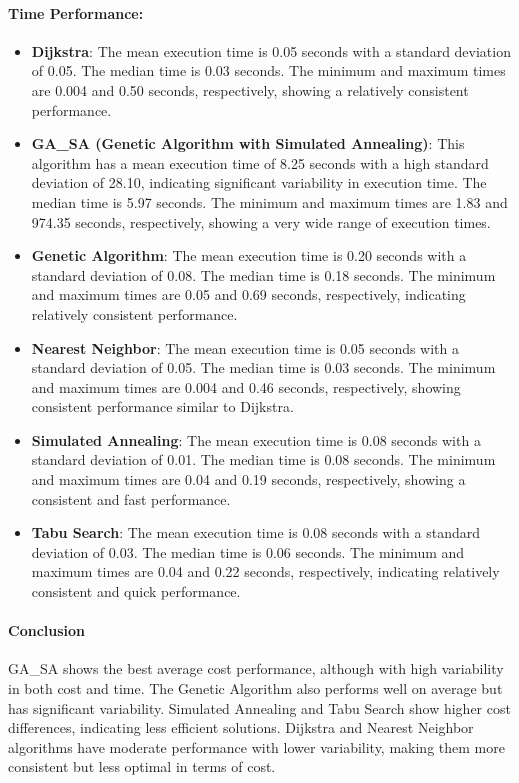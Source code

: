 \documentclass{article}
\begin{document}
    \paragraph{Time Performance:}
    \begin{itemize}
        \item \textbf{Dijkstra}: The mean execution time is 0.05 seconds with a standard deviation of 0.05. The median time is 0.03 seconds. The minimum and maximum times are 0.004 and 0.50 seconds, respectively, showing a relatively consistent performance.
        \item \textbf{GA\_SA (Genetic Algorithm with Simulated Annealing)}: This algorithm has a mean execution time of 8.25 seconds with a high standard deviation of 28.10, indicating significant variability in execution time. The median time is 5.97 seconds. The minimum and maximum times are 1.83 and 974.35 seconds, respectively, showing a very wide range of execution times.
        \item \textbf{Genetic Algorithm}: The mean execution time is 0.20 seconds with a standard deviation of 0.08. The median time is 0.18 seconds. The minimum and maximum times are 0.05 and 0.69 seconds, respectively, indicating relatively consistent performance.
        \item \textbf{Nearest Neighbor}: The mean execution time is 0.05 seconds with a standard deviation of 0.05. The median time is 0.03 seconds. The minimum and maximum times are 0.004 and 0.46 seconds, respectively, showing consistent performance similar to Dijkstra.
        \item \textbf{Simulated Annealing}: The mean execution time is 0.08 seconds with a standard deviation of 0.01. The median time is 0.08 seconds. The minimum and maximum times are 0.04 and 0.19 seconds, respectively, showing a consistent and fast performance.
        \item \textbf{Tabu Search}: The mean execution time is 0.08 seconds with a standard deviation of 0.03. The median time is 0.06 seconds. The minimum and maximum times are 0.04 and 0.22 seconds, respectively, indicating relatively consistent and quick performance.
    \end{itemize}

    \paragraph{Conclusion}

    GA\_SA shows the best average cost performance, although with high variability in both cost and time.
    The Genetic Algorithm also performs well on average but has significant variability.
    Simulated Annealing and Tabu Search show higher cost differences, indicating less efficient solutions.
    Dijkstra and Nearest Neighbor algorithms have moderate performance with lower variability, making them more consistent but less optimal in terms of cost.
\end{document}
